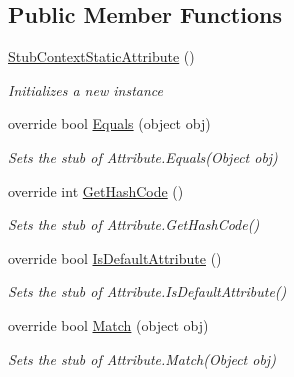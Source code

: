\subsection*{Public Member Functions}
\begin{DoxyCompactItemize}
\item 
\hyperlink{class_system_1_1_fakes_1_1_stub_context_static_attribute_a282a4adaab06adf43b678c3620f07a99}{Stub\-Context\-Static\-Attribute} ()
\begin{DoxyCompactList}\small\item\em Initializes a new instance\end{DoxyCompactList}\item 
override bool \hyperlink{class_system_1_1_fakes_1_1_stub_context_static_attribute_a2b865e7b6256bb4d85a662fb1f276076}{Equals} (object obj)
\begin{DoxyCompactList}\small\item\em Sets the stub of Attribute.\-Equals(\-Object obj)\end{DoxyCompactList}\item 
override int \hyperlink{class_system_1_1_fakes_1_1_stub_context_static_attribute_a7bb5624887654d0d81ad25e06bf45732}{Get\-Hash\-Code} ()
\begin{DoxyCompactList}\small\item\em Sets the stub of Attribute.\-Get\-Hash\-Code()\end{DoxyCompactList}\item 
override bool \hyperlink{class_system_1_1_fakes_1_1_stub_context_static_attribute_af21870b0c1b9b62738aceedf099cc00c}{Is\-Default\-Attribute} ()
\begin{DoxyCompactList}\small\item\em Sets the stub of Attribute.\-Is\-Default\-Attribute()\end{DoxyCompactList}\item 
override bool \hyperlink{class_system_1_1_fakes_1_1_stub_context_static_attribute_a215e8bc947588b3c9f7f74d99477fed3}{Match} (object obj)
\begin{DoxyCompactList}\small\item\em Sets the stub of Attribute.\-Match(\-Object obj)\end{DoxyCompactList}\end{DoxyCompactItemize}
